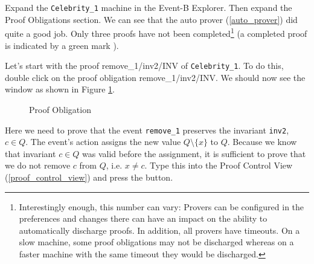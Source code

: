 Expand the \texttt{Celebrity\_1} machine in the \textsf{Event-B Explorer}. Then expand the \textsf{Proof Obligations} section. We can see that the auto prover (\ref{auto_prover}) did quite a good job. Only three proofs have not been completed\footnote{Interestingly enough, this number can vary: Provers can be configured in the preferences and changes there can have an impact on the ability to automatically discharge proofs.  In addition, all provers have timeouts.  On a slow machine, some proof obligations may not be discharged whereas on a faster machine with the same timeout they would be discharged.}  (a completed proof is indicated by a green mark ). 


Let's start with the proof \textsf{remove\_1/inv2/INV} of \texttt{Celebrity\_1}.
To do this, double click on the proof obligation \textsf{remove\_1/inv2/INV}.
We should now see the window as shown in Figure \ref{fig_tut_08_proof_obligation}.


\begin{figure}[!ht]
\begin{center}
	\caption{Proof Obligation}
	\label{fig_tut_08_proof_obligation}
\end{center}
\end{figure}


Here we need to prove that the event \texttt{remove\_1} preserves the invariant \texttt{inv2},
  $c\in Q$.
The event's action assigns the new value $Q\setminus \{x\}$ to $Q$.
Because we know that invariant $c\in Q$ was valid before the assignment, 
 it is sufficient to prove that we do not remove $c$ from $Q$, i.e. \textsf{$x \neq c$}. Type this into the \textsf{Proof Control View} (\ref{proof_control_view}) and press the \textsf{ button}. 


